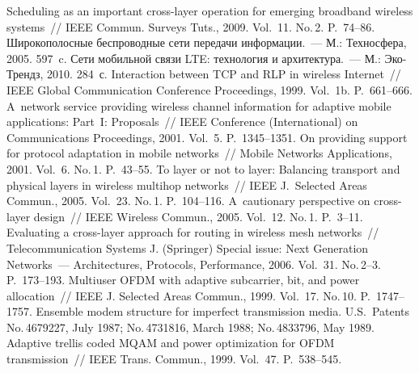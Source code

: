 \begin{multicols}{2}
{\small\frenchspacing
{%
\begin{thebibliography}{99}

 Scheduling as an important cross-layer operation for emerging broadband wireless systems~// 
IEEE Commun. Surveys Tuts., 2009. Vol.~11. No.\,2. P.~74--86.
Широкополосные беспроводные сети передачи информации.~--- М.: Техносфера, 2005. 
597~c.
 Сети мобильной связи LTE: 
технология и архитектура.~--- М.: Эко-Трендз, 2010. 284~с.
 Interaction between TCP and RLP in wireless 
Internet~// IEEE Global Communication Conference Proceedings, 1999. Vol.~1b. P.~661--666.
 A~network service providing wireless channel information for adaptive mobile 
applications: Part~I: Proposals~// IEEE  Conference (International) on Communications 
Proceedings, 2001. Vol.~5. P.~1345--1351.
On providing support for protocol adaptation in mobile networks~// Mobile Networks 
Applications, 2001. Vol.~6. No.\,1. P.~43--55.
 To layer or not to layer: Balancing transport and physical layers in wireless 
multihop networks~// IEEE J.~Selected Areas  Commun., 2005. Vol.~23. No.\,1. 
P.~104--116. 
A~cautionary perspective on cross-layer design~// IEEE Wireless Commun., 2005. Vol.~12. 
No.\,1. P.~3--11.
 Evaluating a cross-layer approach for routing in wireless mesh 
networks~// Telecommunication Systems J. (Springer) Special issue: Next Generation 
Networks~--- Architectures, Protocols, Performance, 2006. Vol.~31. No.\,2--3. P.~173--193.
 Multiuser OFDM with adaptive subcarrier, bit, 
and power allocation~// IEEE J. Selected Areas  Commun., 1999. Vol.~17. No.\,10. 
P.~1747--1757.
 Ensemble modem structure for imperfect transmission media. U.S.\ 
Patents No.\,4679227, July 1987; No.\,4731816, March 1988; No.\,4833796, May 1989.
\bibitem{12-gai}
 Adaptive trellis coded MQAM and 
power optimization for OFDM transmission~// IEEE Trans. Commun., 1999. Vol.~47. 
P.~538--545.

\end{thebibliography}}}
\end{multicols}
